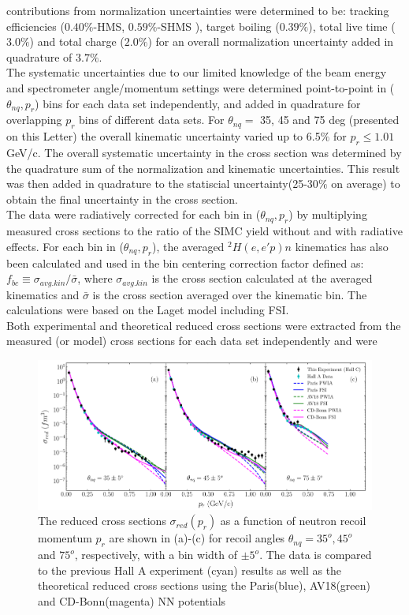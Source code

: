 contributions from normalization uncertainties were determined to be: tracking efficiencies ($0.40 \%$-HMS, $0.59 \%$-SHMS ), target boiling ($0.39 \%$), total live time ($3.0 \%$) and total charge ($2.0\%$)
for an overall normalization uncertainty added in quadrature of $3.7 \%$. \\
\indent The systematic uncertainties due to our limited knowledge of the beam energy and spectrometer angle/momentum settings were determined point-to-point in ($\theta_{nq}, p_{r}$) bins for each data set independently, and added in quadrature for overlapping $p_{r}$ bins
of different data sets. For $\theta_{nq}=$ 35, 45 and 75 deg (presented on this Letter) the overall kinematic uncertainty varied up to 6.5$\%$ for $p_{r}\leq1.01$ GeV/c.
The overall systematic uncertainty in the cross section was determined by the quadrature sum of the normalization and kinematic uncertainties. This result was then added in quadrature
to the statiscial uncertainty(25-30$\%$ on average) to obtain the final uncertainty in the cross section. \\
\indent The data were radiatively corrected for each bin in ($\theta_{nq}, p_{r}$) by multiplying measured cross sections to the ratio of the SIMC yield without and with radiative effects.
For each bin in ($\theta_{nq}, p_{r}$), the averaged $^{2}H(e,e'p)n$ kinematics has also been calculated and used in the bin centering correction factor defined as:
$f_{bc} \equiv \sigma_{avg.kin} / \bar{\sigma}$, where $\sigma_{avg.kin}$ is the cross section calculated at the averaged kinematics and $\bar{\sigma}$ is the cross
section averaged over the kinematic bin. The calculations were based on the Laget model including FSI\cite{LAGET2005, PhysRevC.21.861}.\\
\indent Both experimental and theoretical reduced cross sections were extracted from the measured (or model) cross sections for each data set independently and were 
\onecolumngrid
\begin{center}
\begin{figure}[hb!]
\includegraphics[scale=0.50]{../prl_plots/PRL_plot1.pdf}
\caption{The reduced cross sections $\sigma_{red}(p_{r})$ as a function of neutron recoil momentum $p_{r}$ are shown in (a)-(c) for recoil angles $\theta_{nq}=35^{o}, 45^{o}$ and $75^{o}$, respectively,
with a bin width of $\pm 5^{o}$. The data is compared to the previous Hall A experiment (cyan) results\cite{PhysRevLett.107.262501} as well as the theoretical reduced cross sections using the Paris(blue),
AV18(green) and CD-Bonn(magenta) NN potentials}
\label{fig:fig1}
\end{figure}
\end{center}
